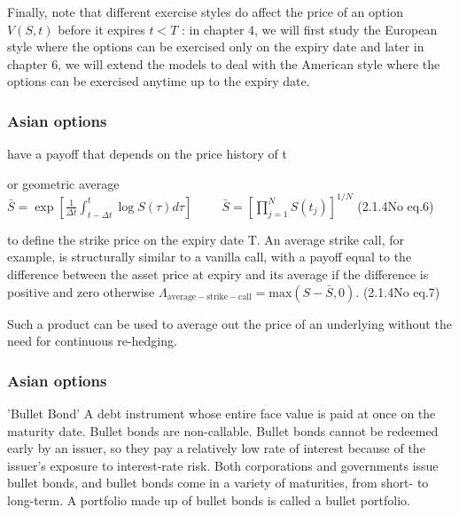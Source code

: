 \documentclass{beamer}
\begin{document}
	\begin{frame}
		Finally, note that different exercise styles do affect the price of an option $ V(S,t)$ before it expires $ t<T$ : in chapter 4, we will first study the European style where the options can be exercised only on the expiry date and later in chapter 6, we will extend the models to deal with the American style where the options can be exercised anytime up to the expiry date.
		
		
	\end{frame}
	\begin{frame}
		\frametitle{Asian options}
		have a payoff that depends on the price history of t
		
		
		or geometric average
		$\displaystyle \bar{S}=\exp\left[\frac{1}{\Delta t}\int_{t-\Delta t}^{t} \log S(\tau)d\tau \right]\hspace{1cm} \bar{S}=\left[\prod_{j=1}^N S(t_j)\right]^{1/N}$	 (2.1.4No eq.6)
		
		
		to define the strike price on the expiry date T. An average strike call, for example, is structurally similar to a vanilla call, with a payoff equal to the difference between the asset price at expiry and its average if the difference is positive and zero otherwise
		$\displaystyle \Lambda_\mathrm{average-strike-call}=\mathrm{max}(S-\bar{S},0).$	 (2.1.4No eq.7)
		
		
		Such a product can be used to average out the price of an underlying without the need for continuous re-hedging.
		
	\end{frame}
	
	
	
	\begin{frame}
		\frametitle{Asian options}
		
		'Bullet Bond'
		A debt instrument whose entire face value is paid at once on the maturity date. Bullet bonds are non-callable. Bullet bonds cannot be redeemed early by an issuer, so they pay a relatively low rate of interest because of the issuer's exposure to interest-rate risk. Both corporations and governments issue bullet bonds, and bullet bonds come in a variety of maturities, from short- to long-term. A portfolio made up of bullet bonds is called a bullet portfolio. 
	\end{frame}
	
\end{document}
